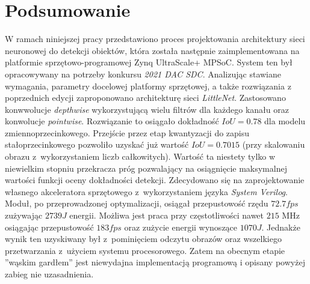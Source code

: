 \chapter{Podsumowanie}
\label{cha:Podsumowanie}


W ramach niniejszej pracy przedstawiono proces projektowania architektury sieci neuronowej do detekcji obiektów, która została następnie zaimplementowana na platformie sprzętowo-programowej Zynq UltraScale+ MPSoC.
System ten był opracowywany na potrzeby konkursu \emph{2021 DAC SDC}. 
Analizując stawiane wymagania, parametry docelowej platformy sprzętowej, a także rozwiązania z poprzednich edycji zaproponowano architekturę sieci \emph{LittleNet}.
Zastosowano konwwolucje \emph{depthwise} wykorzystującą wielu filtrów dla każdego kanału oraz konwolucje \emph{pointwise}.
Rozwiązanie to osiągało dokładność $IoU = 0.78$ dla modelu zmiennoprzecinkowego.
Przejście przez etap kwantyzacji do zapisu stałoprzecinkowego pozwoliło uzyskać już wartość $IoU = 0.7015$ (przy skalowaniu obrazu z~wykorzystaniem liczb całkowitych).
Wartość ta niestety tylko w niewielkim stopniu przekracza próg pozwalający na osiągnięcie maksymalnej wartości funkcji oceny dokładności detekcji.
Zdecydowano się na zaprojektowanie własnego akceleratora sprzętowego z~wykorzystaniem języka \emph{System Verilog}. 
Moduł, po przeprowadzonej optymalizacji, osiągał przepustowość rzędu $72.7 fps$ zużywając $2739 J$ energii.
Możliwa jest praca przy częstotliwości nawet $215$ MHz osiągając przepustowość $183 fps$ oraz zużycie energii wynoszące $1070 J$. 
Jednakże wynik ten uzyskiwany był z~pominięciem odczytu obrazów oraz wszelkiego przetwarzania z~użyciem systemu procesorowego.
Zatem na obecnym etapie ''wąskim gardłem'' jest niewydajna implementacją programową
i opisany powyżej zabieg nie uzasadnienia.

